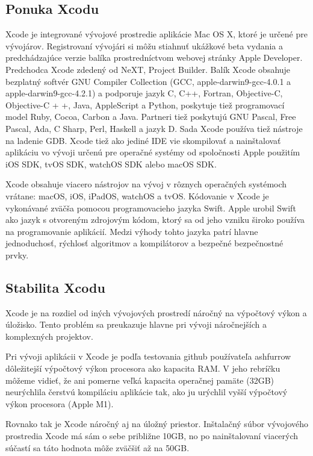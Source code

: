 \documentclass[12pt]{article}
\begin{document}
		\subsection{Ponuka Xcodu}
			Xcode je integrované vývojové prostredie aplikácie Mac OS X, ktoré je určené pre vývojárov. Registrovaní vývojári si môžu stiahnuť ukážkové beta vydania a predchádzajúce verzie balíka prostredníctvom webovej stránky Apple Developer. Predchodca Xcode zdedený od NeXT, Project Builder. Balík Xcode obsahuje bezplatný softvér GNU Compiler Collection (GCC, apple-darwin9-gcc-4.0.1 a apple-darwin9-gcc-4.2.1) a podporuje jazyk C, C++, Fortran, Objective-C, Objective-C + +, Java, AppleScript a Python, poskytuje tiež programovací model Ruby, Cocoa, Carbon a Java. Partneri tiež poskytujú GNU Pascal, Free Pascal, Ada, C Sharp, Perl, Haskell a jazyk D. Sada Xcode používa tiež nástroje na ladenie GDB. \cite {xcodeieee}  Xcode tiež ako jediné IDE vie skompilovať a nainštalovať aplikáciu vo vývoji určenú pre operačné systémy od spoločnosti Apple použitím iOS SDK,  tvOS SDK,  watchOS SDK alebo macOS SDK.  \cite{xcodewiki} \par
			Xcode obsahuje viacero nástrojov na vývoj v rôznych operačných systémoch vrátane: macOS, iOS, iPadOS, watchOS a tvOS. Kódovanie v Xcode je vykonávané zväčša  pomocou programovacieho jazyka Swift. Apple urobil Swift ako jazyk s otvoreným zdrojovým kódom, ktorý sa od jeho vzniku široko používa na programovanie aplikácií. Medzi výhody tohto jazyka patrí hlavne jednoduchosť, rýchlosť algoritmov a kompilátorov a bezpečné bezpečnostné prvky. \cite{xcodedev}


		\subsection{Stabilita Xcodu}
			Xcode je na rozdiel od iných vývojových prostredí náročný na výpočtový výkon a úložisko.  Tento problém sa preukazuje hlavne pri vývoji náročnejších a komplexných projektov.  \par
			Pri vývoji aplikácii v Xcode je podľa testovania github používateľa ashfurrow \cite{ashfurrow} dôležitejší výpočtový výkon procesora ako kapacita RAM.  V jeho rebríčku môžeme vidieť, že ani pomerne veľká kapacita operačnej pamäte (32GB) neurýchlila čerstvú kompiláciu aplikácie tak,  ako ju urýchlil vyšší výpočtový výkon procesora (Apple M1).  \par
			Rovnako tak je Xcode náročný aj na úložný priestor.  Inštalačný súbor vývojového prostredia Xcode má sám o sebe približne 10GB,  no po nainštalovaní viacerých súčastí sa táto hodnota môže zväčšiť až na 50GB.
\end{document}
